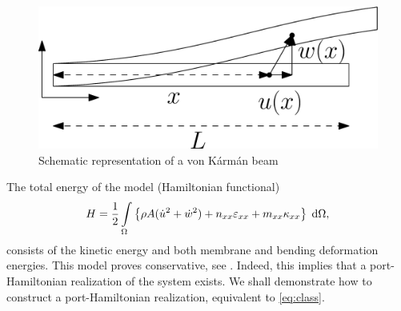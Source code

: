 \documentclass{ifacconf}
\begin{document}
\begin{figure}[ht]%
	\centering
		\includegraphics[width=0.95\columnwidth]{vKbeam.eps}%
	\caption{Schematic representation of a von K\'arm\'an beam}%
	\label{fig:vKbeam}%
\end{figure}

The total energy of the model (Hamiltonian functional)
\begin{equation}
	H = \frac{1}{2} \int_{\Omega}\left\{\rho A (\dot{u}^2 + \dot{w}^2) + n_{xx} \varepsilon_{xx} + m_{xx} \kappa_{xx} \right\} \d\Omega,
\end{equation}
consists of the kinetic energy and both membrane and bending deformation energies.
This model proves conservative, see \cite{bilbao2015conservative}. Indeed, this implies that a port-Hamiltonian realization of the system exists. We shall demonstrate how to construct a port-Hamiltonian realization, equivalent to \eqref{eq:class}.
\end{document}
